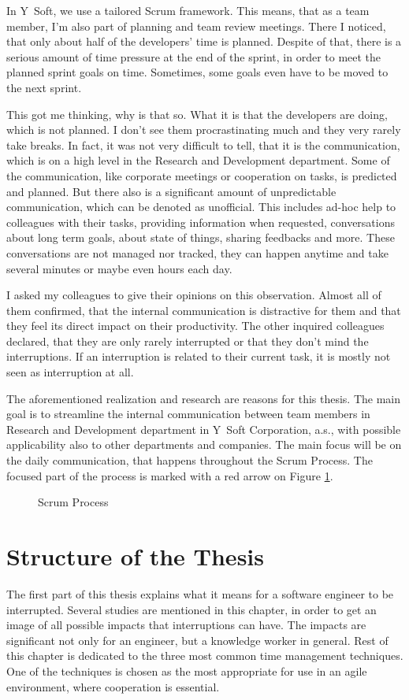 \documentclass[11pt,singleside]{myfithesis2}
\newcommand{\pict}[4]{
	\begin{figure}[h!]
  		\vspace{-7px}
  		\centerline{\fcolorbox{darkgray}{palegray}{\texttt{[image: \#2]}}}
  		\caption{#1}
  		\label{#4}
	\end{figure}
}
\begin{document}
In Y~Soft, we use a tailored Scrum framework. This means, that as a team member, I'm also part of planning and team review meetings. There I noticed, that only about half of the developers' time is planned. Despite of that, there is a serious amount of time pressure at the end of the sprint, in order to meet the planned sprint goals on time. Sometimes, some goals even have to be moved to the next sprint.

This got me thinking, why is that so. What it is that the developers are doing, which is not planned. I don't see them procrastinating much and they very rarely take breaks. In fact, it was not very difficult to tell, that it is the communication, which is on a high level in the Research and Development department. Some of the communication, like corporate meetings or cooperation on tasks, is predicted and planned. But there also is a significant amount of unpredictable communication, which can be denoted as unofficial. This includes ad-hoc help to colleagues with their tasks, providing information when requested, conversations about long term goals, about state of things, sharing feedbacks and more. These conversations are not managed nor tracked, they can happen anytime and take several minutes or maybe even hours each day.

I asked my colleagues to give their opinions on this observation. Almost all of them confirmed, that the internal communication is distractive for them and that they feel its direct impact on their productivity. The other inquired colleagues declared, that they are only rarely interrupted or that they don't mind the interruptions. If an interruption is related to their current task, it is mostly not seen as interruption at all.

The aforementioned realization and research are reasons for this thesis. The main goal is to streamline the internal communication between team members in Research and Development department in Y~Soft Corporation, a.s., with possible applicability also to other departments and companies. The main focus will be on the daily communication, that happens throughout the Scrum Process. The focused part of the process is marked with a red arrow on Figure \ref{pic:scrumProcess}.

\pict{Scrum Process \cite{scrumProcess}}{data/Scrum_process.png}{width=0.8\textwidth}{pic:scrumProcess}


	\section{Structure of the Thesis}
The first part of this thesis explains what it means for a software engineer to be interrupted. Several studies are mentioned in this chapter, in order to get an image of all possible impacts that interruptions can have. The impacts are significant not only for an engineer, but a knowledge worker in general. Rest of this chapter is dedicated to the three most common time management techniques. One of the techniques is chosen as the most appropriate for use in an agile environment, where cooperation is essential.
\end{document}
